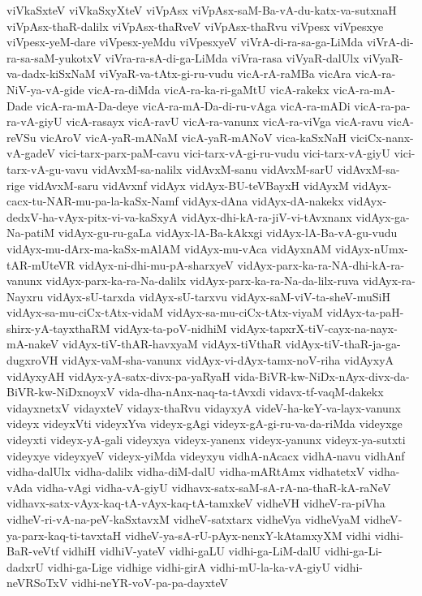 {viVkaSxteV
viVkaSxyXteV
viVpAsx
viVpAsx-saM-Ba-vA-du-katx-va-sutxnaH
viVpAsx-thaR-dalilx
viVpAsx-thaRveV
viVpAsx-thaRvu
viVpesx
viVpesxye
viVpesx-yeM-dare
viVpesx-yeMdu
viVpesxyeV
viVrA-di-ra-sa-ga-LiMda
viVrA-di-ra-sa-saM-yukotxV
viVra-ra-sA-di-ga-LiMda
viVra-rasa
viVyaR-dalUlx
viVyaR-va-dadx-kiSxNaM
viVyaR-va-tAtx-gi-ru-vudu
vicA-rA-raMBa
vicAra
vicA-ra-NiV-ya-vA-gide
vicA-ra-diMda
vicA-ra-ka-ri-gaMtU
vicA-rakekx
vicA-ra-mA-Dade
vicA-ra-mA-Da-deye
vicA-ra-mA-Da-di-ru-vAga
vicA-ra-mADi
vicA-ra-pa-ra-vA-giyU
vicA-rasayx
vicA-ravU
vicA-ra-vanunx
vicA-ra-viVga
vicA-ravu
vicA-reVSu
vicAroV
vicA-yaR-mANaM
vicA-yaR-mANoV
vica-kaSxNaH
viciCx-nanx-vA-gadeV
vici-tarx-parx-paM-cavu
vici-tarx-vA-gi-ru-vudu
vici-tarx-vA-giyU
vici-tarx-vA-gu-vavu
vidAvxM-sa-nalilx
vidAvxM-sanu
vidAvxM-sarU
vidAvxM-sa-rige
vidAvxM-saru
vidAvxnf
vidAyx
vidAyx-BU-teVBayxH
vidAyxM
vidAyx-cacx-tu-NAR-mu-pa-la-kaSx-Namf
vidAyx-dAna
vidAyx-dA-nakekx
vidAyx-dedxV-ha-vAyx-pitx-vi-va-kaSxyA
vidAyx-dhi-kA-ra-jiV-vi-tAvxnanx
vidAyx-ga-Na-patiM
vidAyx-gu-ru-gaLa
vidAyx-lA-Ba-kAkxgi
vidAyx-lA-Ba-vA-gu-vudu
vidAyx-mu-dArx-ma-kaSx-mAlAM
vidAyx-mu-vAca
vidAyxnAM
vidAyx-nUmx-tAR-mUteVR
vidAyx-ni-dhi-mu-pA-sharxyeV
vidAyx-parx-ka-ra-NA-dhi-kA-ra-vanunx
vidAyx-parx-ka-ra-Na-dalilx
vidAyx-parx-ka-ra-Na-da-lilx-ruva
vidAyx-ra-Nayxru
vidAyx-sU-tarxda
vidAyx-sU-tarxvu
vidAyx-saM-viV-ta-sheV-muSiH
vidAyx-sa-mu-ciCx-tAtx-vidaM
vidAyx-sa-mu-ciCx-tAtx-viyaM
vidAyx-ta-paH-shirx-yA-tayxthaRM
vidAyx-ta-poV-nidhiM
vidAyx-tapxrX-tiV-cayx-na-nayx-mA-nakeV
vidAyx-tiV-thAR-havxyaM
vidAyx-tiVthaR
vidAyx-tiV-thaR-ja-ga-dugxroVH
vidAyx-vaM-sha-vanunx
vidAyx-vi-dAyx-tamx-noV-riha
vidAyxyA
vidAyxyAH
vidAyx-yA-satx-divx-pa-yaRyaH
vida-BiVR-kw-NiDx-nAyx-divx-da-BiVR-kw-NiDxnoyxV
vida-dha-nAnx-naq-ta-tAvxdi
vidavx-tf-vaqM-dakekx
vidayxnetxV
vidayxteV
vidayx-thaRvu
vidayxyA
videV-ha-keY-va-layx-vanunx
videyx
videyxVti
videyxYva
videyx-gAgi
videyx-gA-gi-ru-va-da-riMda
videyxge
videyxti
videyx-yA-gali
videyxya
videyx-yanenx
videyx-yanunx
videyx-ya-sutxti
videyxye
videyxyeV
videyx-yiMda
videyxyu
vidhA-nAcacx
vidhA-navu
vidhAnf
vidha-dalUlx
vidha-dalilx
vidha-diM-dalU
vidha-mARtAmx
vidhatetxV
vidha-vAda
vidha-vAgi
vidha-vA-giyU
vidhavx-satx-saM-sA-rA-na-thaR-kA-raNeV
vidhavx-satx-vAyx-kaq-tA-vAyx-kaq-tA-tamxkeV
vidheVH
vidheV-ra-piVha
vidheV-ri-vA-na-peV-kaSxtavxM
vidheV-satxtarx
vidheVya
vidheVyaM
vidheV-ya-parx-kaq-ti-tavxtaH
vidheV-ya-sA-rU-pAyx-nenxY-kAtamxyXM
vidhi
vidhi-BaR-veVtf
vidhiH
vidhiV-yateV
vidhi-gaLU
vidhi-ga-LiM-dalU
vidhi-ga-Li-dadxrU
vidhi-ga-Lige
vidhige
vidhi-girA
vidhi-mU-la-ka-vA-giyU
vidhi-neVRSoTxV
vidhi-neYR-voV-pa-pa-dayxteV
}
